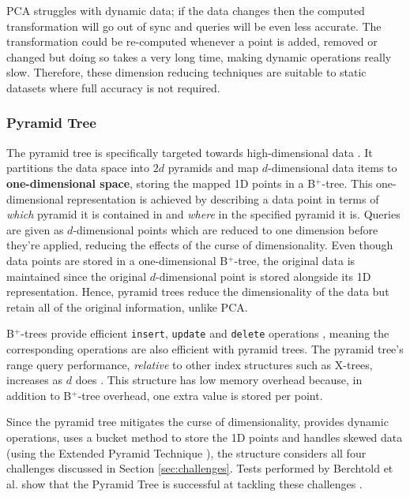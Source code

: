 PCA struggles with dynamic data; if the data changes then the computed transformation will go out of sync and queries will be even less accurate. The transformation could be re-computed whenever a point is added, removed or changed but doing so takes a very long time, making dynamic operations really slow. Therefore, these dimension reducing techniques are suitable to static datasets where full accuracy is not required.

\subsubsection{Pyramid Tree}
\label{sec:pyramid-tree}

The pyramid tree is specifically targeted towards high-dimensional data \cite{pyramid-tree}. It partitions the data space into $2d$ pyramids and map $d$-dimensional data items to \textbf{one-dimensional space}, storing the mapped 1D points in a B${}^{+}$-tree. This one-dimensional representation is achieved by describing a data point in terms of \textit{which} pyramid it is contained in and \textit{where} in the specified pyramid it is. Queries are given as $d$-dimensional points which are reduced to one dimension before they're applied, reducing the effects of the curse of dimensionality. Even though data points are stored in a one-dimensional B${}^{+}$-tree, the original data is maintained since the original $d$-dimensional point is stored alongside its 1D representation. Hence, pyramid trees reduce the dimensionality of the data but retain all of the original information, unlike PCA.

B${}^{+}$-trees provide efficient \texttt{insert}, \texttt{update} and \texttt{delete} operations \cite{ubiquitous-btree}, meaning the corresponding operations are also efficient with pyramid trees. The pyramid tree's range query performance, \textit{relative} to other index structures such as X-trees, increases as $d$ does \cite{pyramid-tree}. This structure has low memory overhead because, in addition to B${}^{+}$-tree overhead, one extra value is stored per point.

Since the pyramid tree mitigates the curse of dimensionality, provides dynamic operations, uses a bucket method to store the 1D points and handles skewed data (using the Extended Pyramid Technique \cite{pyramid-tree}), the structure considers all four challenges discussed in Section \ref{sec:challenges}. Tests performed by Berchtold et al. show that the Pyramid Tree is successful at tackling these challenges \cite{pyramid-tree}.

